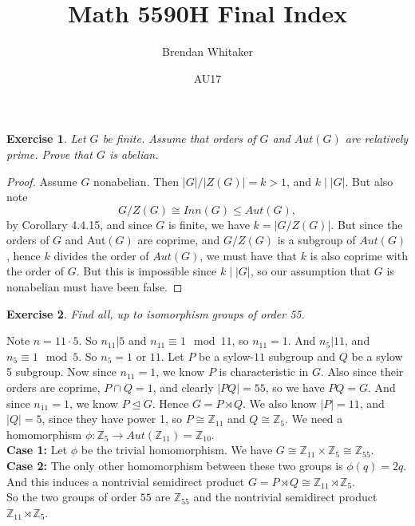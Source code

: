 \documentclass[10pt,oneside,reqno]{amsart}
\theoremstyle{plain}
\newtheorem{e}{Exercise}
\theoremstyle{definition}
\newcommand{\norm}{\trianglelefteq}
\newcommand{\semi}{\rtimes}
\begin{document}
\title{Math 5590H Final Index}

\date{AU17}

\author[Brendan Whitaker]{Brendan Whitaker}

\maketitle

\begin{e}
Let $G$ be finite. Assume that orders of $G$ and $Aut(G)$ are relatively prime. Prove that $G$ is abelian. 
\end{e}
\begin{proof}
Assume $G$ nonabelian. Then $|G|/|Z(G)|  = k> 1$, and $k\mid |G|$. But also note 
$$G/Z(G) \cong Inn(G) \leq Aut(G),$$
 by Corollary 4.4.15, and since $G$ is finite, we have $k = |G/Z(G)|$. But since the orders of $G$ and Aut$(G)$ are coprime, and $G/Z(G)$ is a subgroup of $Aut(G)$, hence $k$ divides the order of $Aut(G)$, we must have that $k$ is also coprime with the order of $G$. But this is impossible since $k \mid |G|$, so our assumption that $G$ is nonabelian must have been false. 
\end{proof}

\begin{e}
Find all, up to isomorphism groups of order 55. 
\end{e}
Note $n = 11 \cdot 5$. So $n_{11}|5$ and $n_{11} \equiv 1 \mod 11$, so $n_{11} = 1$. And $n_5|11$, and $n_5 \equiv 1 \mod 5$. So $n_5 = 1$ or $11$. Let $P$ be a sylow-$11$ subgroup and $Q$ be a sylow 5 subgroup. Now since $n_{11} = 1$, we know $P$ is characteristic in $G$. Also since their orders are coprime, $P \cap Q = 1$, and clearly $|PQ| = 55$, so we have $PQ = G$. And since $n_{11} = 1$, we know $P \norm G$. Hence $G = P \semi Q$. We also know $|P| = 11$, and $|Q| = 5$, since they have power 1, so $P \cong \mathbb{Z}_{11}$ and $Q \cong \mathbb{Z}_5$.  We need a homomorphism $\phi: \mathbb{Z}_5 \to Aut(\mathbb{Z}_{11}) = \mathbb{Z}_{10}$. \\
\textbf{Case 1: } Let $\phi$ be the trivial homomorphism. We have $G \cong \mathbb{Z}_{11} \times \mathbb{Z}_5 \cong \mathbb{Z}_{55}$. \\
\textbf{Case 2: } The only other homomorphism between these two groups is $\phi(q) = 2q$. And this induces a nontrivial semidirect product $G = P \semi Q \cong \mathbb{Z}_{11} \semi \mathbb{Z}_5$. \\
So the two groups of order $55$ are $\mathbb{Z}_{55}$ and the nontrivial semidirect product $\mathbb{Z}_{11} \semi \mathbb{Z}_{5}$. 
\end{document}
